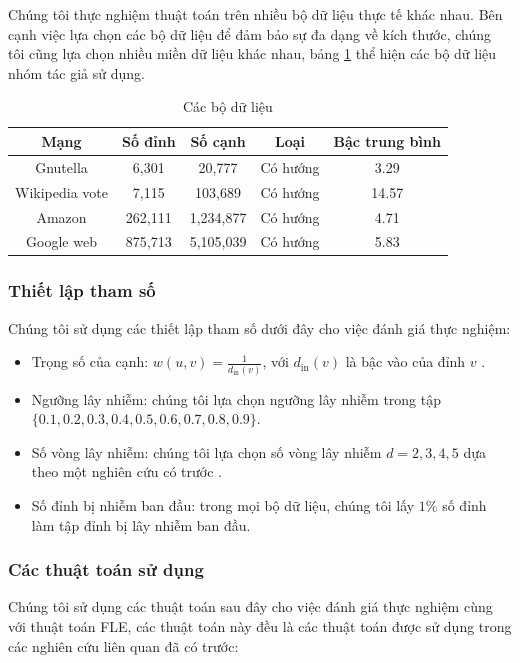 Chúng tôi thực nghiệm thuật toán trên nhiều bộ dữ liệu thực tế khác nhau. Bên cạnh việc lựa chọn các bộ dữ liệu để đảm bảo sự đa dạng về kích thước, chúng tôi cũng lựa chọn nhiều miền dữ liệu khác nhau, bảng \ref{tab:Table1} thể hiện các bộ dữ liệu nhóm tác giả sử dụng.
\begin{table}
	\centering
	\begin{tabular}{|c|c|c|c|c|}
		\hline 
		Mạng & Số đỉnh & Số cạnh & Loại & Bậc trung bình \\ 
		\hline 
		Gnutella & 6,301 & 20,777 & Có hướng & 3.29 \\ 
		\hline 
		Wikipedia vote & 7,115 & 103,689 & Có hướng & 14.57 \\ 
		\hline 
		Amazon & 262,111 & 1,234,877 & Có hướng & 4.71 \\ 
		\hline 
		Google web & 875,713 & 5,105,039 & Có hướng & 5.83 \\ 
		\hline 
	\end{tabular} 
	\caption{Các bộ dữ liệu}
	\label{tab:Table1}
\end{table}

\subsubsection{Thiết lập tham số}
Chúng tôi sử dụng các thiết lập tham số dưới đây cho việc đánh giá thực nghiệm:

\begin{itemize}
	\item Trọng số của cạnh: $w(u,v)=\frac{1}{d_{\text{in}}(v)}$, với $d_{\text{in}}(v)$ là bậc vào của đỉnh $v$ \cite{kemple1} \cite{chen10LT} \cite{khali} \cite{amit21}.
	\item Ngưỡng lây nhiễm: chúng tôi lựa chọn ngưỡng lây nhiễm trong tập \\ $\{0.1, 0.2, 0.3, 0.4, 0.5, 0.6, 0.7, 0.8, 0.9\}$.
	\item Số vòng lây nhiễm: chúng tôi lựa chọn số vòng lây nhiễm $d = 2, 3, 4, 5$ dựa theo một nghiên cứu có trước \cite{cha23}.
	\item Số đỉnh bị nhiễm ban đầu: trong mọi bộ dữ liệu, chúng tôi lấy $1\%$ số đỉnh làm tập đỉnh bị lây nhiễm ban đầu. 
\end{itemize}

\subsubsection{Các thuật toán sử dụng}
Chúng tôi sử dụng các thuật toán sau đây cho việc đánh giá thực nghiệm cùng với thuật toán FLE, các thuật toán này đều là các thuật toán được sử dụng trong các nghiên cứu liên quan đã có trước:

